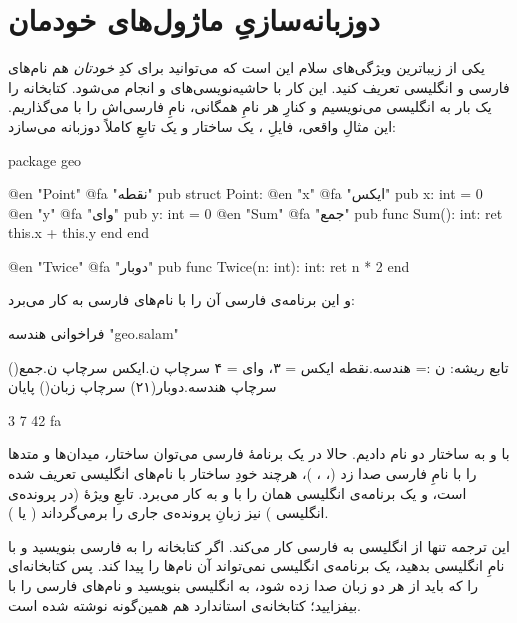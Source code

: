 \section{دوزبانه‌سازیِ ماژول‌های خودمان}

یکی از زیباترین ویژگی‌های سلام این است که می‌توانید برای کدِ \emph{خودتان} هم
نام‌های فارسی و انگلیسی تعریف کنید. این کار با حاشیه‌نویسی‌های  و
 انجام می‌شود. کتابخانه را یک بار به انگلیسی می‌نویسیم و کنارِ هر
نامِ همگانی، نامِ فارسی‌اش را با  می‌گذاریم. این مثالِ واقعی، فایلِ
، یک ساختار و یک تابعِ کاملاً دوزبانه می‌سازد:

\begin{salamen}
package geo

@en "Point"
@fa "نقطه"
pub struct Point:
    @en "x"
    @fa "ایکس"
    pub x: int = 0
    @en "y"
    @fa "وای"
    pub y: int = 0
    @en "Sum"
    @fa "جمع"
    pub func Sum(): int: ret this.x + this.y end
end

@en "Twice"
@fa "دوبار"
pub func Twice(n: int): int:
    ret n * 2
end
\end{salamen}

و این برنامه‌ی فارسی آن را با نام‌های فارسی به کار می‌برد:

\begin{salamfa}
فراخوانی هندسه "geo.salam"

تابع ریشه:
    ن := هندسه.نقطه { ایکس = ۳، وای = ۴ }
    سرچاپ ن.ایکس
    سرچاپ ن.جمع()
    سرچاپ هندسه.دوبار(۲۱)
    سرچاپ زبان()
پایان
\end{salamfa}

\begin{progoutfa}
3
7
42
fa
\end{progoutfa}

با  و  به ساختار دو نام دادیم. حالا در یک
برنامهٔ فارسی می‌توان ساختار، میدان‌ها و متدها را با نامِ فارسی صدا زد
(، ، )، هرچند خودِ ساختار با
نام‌های انگلیسی تعریف شده است، و یک برنامه‌ی انگلیسی همان را با
 و  به کار می‌برد. تابعِ ویژهٔ 
(در پرونده‌ی انگلیسی ) نیز زبانِ پرونده‌ی جاری را برمی‌گرداند
( یا ).

\begin{warn}
این ترجمه تنها از انگلیسی به فارسی کار می‌کند. اگر کتابخانه را به فارسی بنویسید
و با  نامِ انگلیسی بدهید، یک برنامه‌ی انگلیسی نمی‌تواند آن نام‌ها را
پیدا کند. پس کتابخانه‌ای را که باید از هر دو زبان صدا زده شود، به انگلیسی
بنویسید و نام‌های فارسی را با  بیفزایید؛ کتابخانه‌ی استاندارد هم
همین‌گونه نوشته شده است.
\end{warn}

